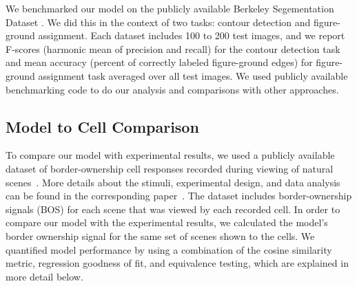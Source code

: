 \documentclass[12pt]{article}
\begin{document}
We benchmarked our model on the publicly available Berkeley Segementation Dataset \citep{Martin_etal01}. We did this in the context of two tasks: contour detection and figure-ground assignment. Each dataset includes 100 to 200 test images, and we report F-scores (harmonic mean of precision and recall) for the contour detection task and mean accuracy (percent of correctly labeled figure-ground edges) for figure-ground assignment task averaged over all test images. We used publicly available benchmarking code to do our analysis and comparisons with other approaches.

\subsection{Model to Cell Comparison}
\label{sec:cell_model}
To compare our model with experimental results, we used a publicly available dataset of border-ownership cell responses recorded during viewing of natural scenes~\citep{Jonathan_data}. More details about the stimuli, experimental design, and data analysis can be found in the corresponding paper~\citep{Williford_vonderHeydt16}.
The dataset includes border-ownership signals (BOS) for each scene that was viewed by each recorded cell. In order to compare our model with the experimental results, we calculated the model's border ownership signal for the same set of scenes shown to the cells. We quantified model performance by using a combination of the cosine similarity metric, regression goodness of fit, and equivalence testing, which are explained in more detail below.
%
\end{document}
